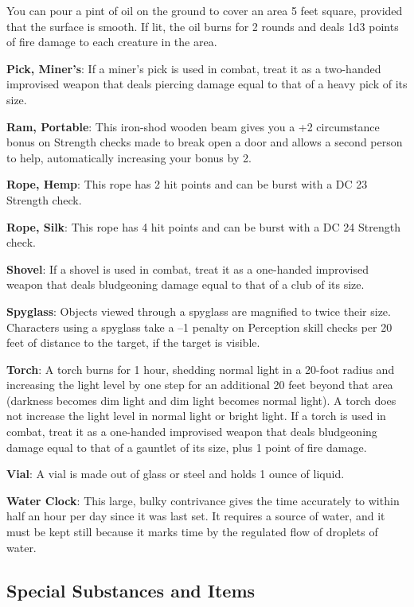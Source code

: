 You can pour a pint of oil on the ground to cover an area 5 feet square, provided that the surface is smooth. If lit, the oil burns for 2 rounds and deals 1d3 points of fire damage to each creature in the area.
		
\textbf{Pick, Miner's}: If a miner's pick is used in combat, treat it as a two-handed improvised weapon that deals piercing damage equal to that of a heavy pick of its size. 
		
\textbf{Ram, Portable}: This iron-shod wooden beam gives you a +2 circumstance bonus on Strength checks made to break open a door and allows a second person to help, automatically increasing your bonus by 2.
		
\textbf{Rope, Hemp}: This rope has 2 hit points and can be burst with a DC 23 Strength check.
		
\textbf{Rope, Silk}: This rope has 4 hit points and can be burst with a DC 24 Strength check.
		
\textbf{Shovel}: If a shovel is used in combat, treat it as a one-handed improvised weapon that deals bludgeoning damage equal to that of a club of its size.
		
\textbf{Spyglass}: Objects viewed through a spyglass are magnified to twice their size. Characters using a spyglass take a --1 penalty on Perception skill checks per 20 feet of distance to the target, if the target is visible.
		
\textbf{Torch}: A torch burns for 1 hour, shedding normal light in a 20-foot radius and increasing the light level by one step for an additional 20 feet beyond that area (darkness becomes dim light and dim light becomes normal light). A torch does not increase the light level in normal light or bright light. If a torch is used in combat, treat it as a one-handed improvised weapon that deals bludgeoning damage equal to that of a gauntlet of its size, plus 1 point of fire damage.
		
\textbf{Vial}: A vial is made out of glass or steel and holds 1 ounce of liquid.
		
\textbf{Water Clock}: This large, bulky contrivance gives the time accurately to within half an hour per day since it was last set. It requires a source of water, and it must be kept still because it marks time by the regulated flow of droplets of water.
	
\subsection{Special Substances and Items}

